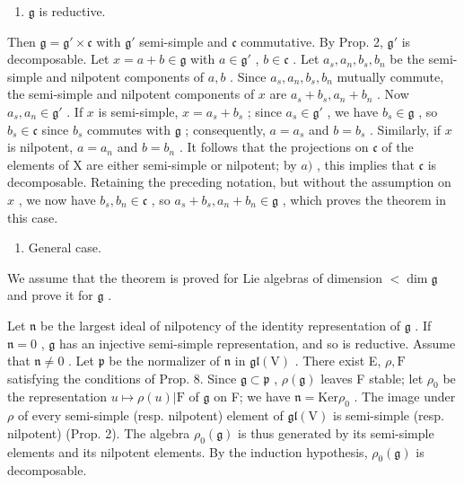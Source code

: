 \begin{enumerate}
\def\labelenumi{\alph{enumi})}
\setcounter{enumi}{1}
\tightlist
\item
  \(\mathfrak{g}\) is reductive.
\end{enumerate}

Then \(\mathfrak{g} = \mathfrak{g}' \times \mathfrak{c}\) with \(\mathfrak{g}'\) semi-simple and \(\mathfrak{c}\) commutative. By Prop. 2, \(\mathfrak{g}'\) is decomposable. Let \(x = a + b \in \mathfrak{g}\) with \(a \in \mathfrak{g}'\) , \(b \in \mathfrak{c}\) . Let \(a_s, a_n, b_s, b_n\) be the semi-simple and nilpotent components of \(a, b\) . Since \(a_s, a_n, b_s, b_n\) mutually commute, the semi-simple and nilpotent components of \(x\) are \(a_s + b_s, a_n + b_n\) . Now \(a_s, a_n \in \mathfrak{g}'\) . If \(x\) is semi-simple, \(x = a_s + b_s\) ; since \(a_s \in \mathfrak{g}'\) , we have \(b_s \in \mathfrak{g}\) , so \(b_s \in \mathfrak{c}\) since \(b_s\) commutes with \(\mathfrak{g}\) ; consequently, \(a = a_s\) and \(b = b_s\) . Similarly, if \(x\) is nilpotent, \(a = a_n\) and \(b = b_n\) . It follows that the projections on \(\mathfrak{c}\) of the elements of X are either semi-simple or nilpotent; by \(a)\) , this implies that \(\mathfrak{c}\) is decomposable. Retaining the preceding notation, but without the assumption on \(x\) , we now have \(b_s, b_n \in \mathfrak{c}\) , so \(a_s + b_s, a_n + b_n \in \mathfrak{g}\) , which proves the theorem in this case.

\begin{enumerate}
\def\labelenumi{\alph{enumi})}
\setcounter{enumi}{2}
\tightlist
\item
  General case.
\end{enumerate}

We assume that the theorem is proved for Lie algebras of dimension \(< \dim \mathfrak{g}\) and prove it for \(\mathfrak{g}\) .

Let \(\mathfrak{n}\) be the largest ideal of nilpotency of the identity representation of \(\mathfrak{g}\) . If \(\mathfrak{n} = 0\) , \(\mathfrak{g}\) has an injective semi-simple representation, and so is reductive. Assume that \(\mathfrak{n} \neq 0\) . Let \(\mathfrak{p}\) be the normalizer of \(\mathfrak{n}\) in \(\mathfrak{gl}(\mathrm{V})\) . There exist E, \(\rho, \mathrm{F}\) satisfying the conditions of Prop. 8. Since \(\mathfrak{g} \subset \mathfrak{p}\) , \(\rho(\mathfrak{g})\) leaves F stable; let \(\rho_0\) be the representation \(u \mapsto \rho(u)|\mathrm{F}\) of \(\mathfrak{g}\) on F; we have \(\mathfrak{n} = \mathrm{Ker}\rho_0\) . The image under \(\rho\) of every semi-simple (resp. nilpotent) element of \(\mathfrak{gl}(\mathrm{V})\) is semi-simple (resp. nilpotent) (Prop. 2). The algebra \(\rho_0(\mathfrak{g})\) is thus generated by its semi-simple elements and its nilpotent elements. By the induction hypothesis, \(\rho_0(\mathfrak{g})\) is decomposable.


